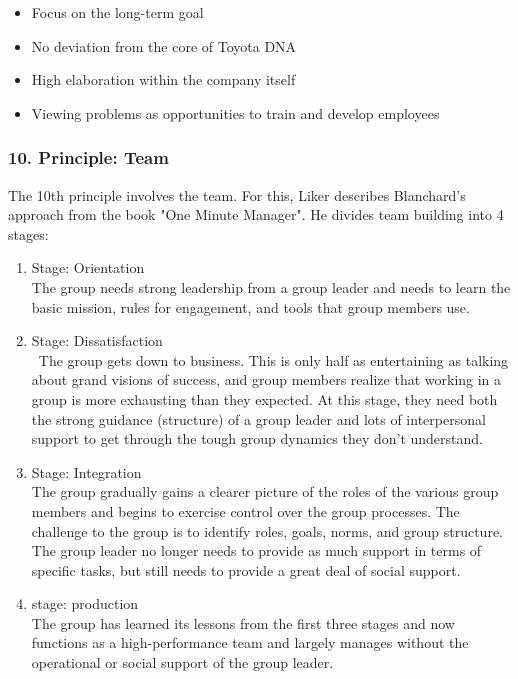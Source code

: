 \documentclass[a4paper,12pt]{scrartcl}
\begin{document}
\begin{itemize}
    \item Focus on the long-term goal
    \item No deviation from the core of Toyota DNA
    \item High elaboration within the company itself
    \item Viewing problems as opportunities to train and develop employees
\end{itemize}

\subsubsection{10. Principle: Team}

The 10th principle involves the team. For this, Liker describes Blanchard's approach from the book "One Minute Manager". He divides team building into 4 stages:

\begin{enumerate}
    \item Stage: Orientation \\
    The group needs strong leadership from a group leader and needs to learn the basic mission, rules for engagement, and tools that group members use.
    \item Stage: Dissatisfaction \\\
    The group gets down to business. This is only half as entertaining as talking about grand visions of success, and group members realize that working in a group is more exhausting than they expected. At this stage, they need both the strong guidance (structure) of a group leader and lots of interpersonal support to get through the tough group dynamics they don't understand.
    \item Stage: Integration \\
    The group gradually gains a clearer picture of the roles of the various group members and begins to exercise control over the group processes. The challenge to the group is to identify roles, goals, norms, and group structure. The group leader no longer needs to provide as much support in terms of specific tasks, but still needs to provide a great deal of social support.
    \item stage: production\\
    The group has learned its lessons from the first three stages and now functions as a high-performance team and largely manages without the operational or social support of the group leader.
\end{enumerate}
\end{document}
